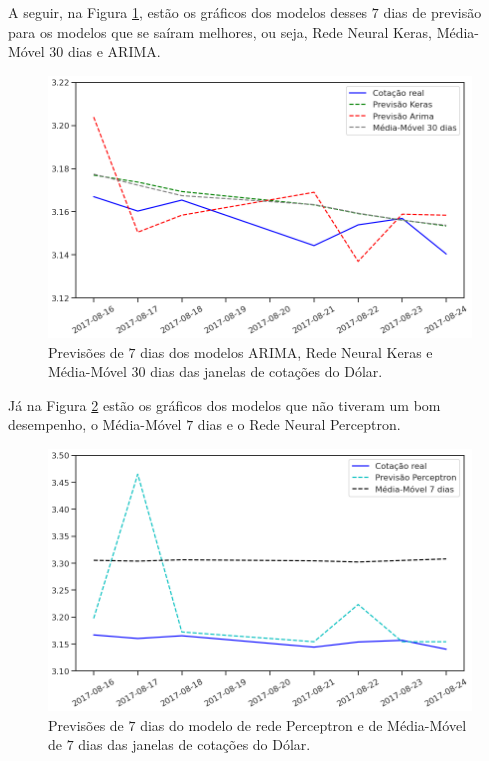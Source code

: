 A seguir, na Figura \ref{fig:series_previsoes_7_1}, estão os gráficos dos modelos desses $7$ dias de previsão para os modelos que se saíram melhores, ou seja, Rede Neural Keras, Média-Móvel $30$ dias e ARIMA.

\begin{figure}[htb]
\centering
\includegraphics[width=14cm]{figuras/series_previsoes_7_1}
\caption{Previsões de $7$ dias dos modelos ARIMA, Rede Neural Keras e Média-Móvel $30$ dias das janelas de cotações do Dólar.}
\label{fig:series_previsoes_7_1}
\end{figure}

Já na Figura \ref{fig:series_previsoes_7_2} estão os gráficos dos modelos que não tiveram um bom desempenho, o Média-Móvel $7$ dias e o Rede Neural Perceptron.

\begin{figure}[htb]
\centering
\includegraphics[width=14cm]{figuras/series_previsoes_7_2}
\caption{Previsões de $7$ dias do modelo de rede Perceptron e de Média-Móvel de $7$ dias das janelas de cotações do Dólar.}
\label{fig:series_previsoes_7_2}
\end{figure}

